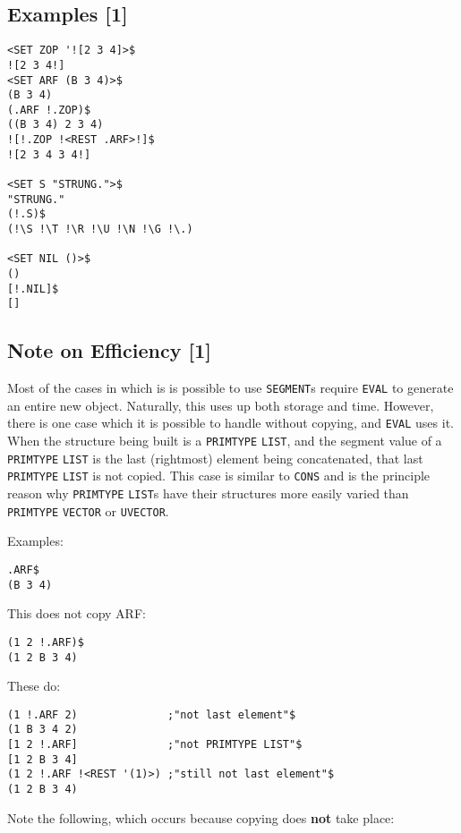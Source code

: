 \documentclass[a4paper]{scrbook}
\begin{document}
\subsection{Examples {[}1{]}}\label{examples-1-1}

\begin{verbatim}
<SET ZOP '![2 3 4]>$
![2 3 4!]
<SET ARF (B 3 4)>$
(B 3 4)
(.ARF !.ZOP)$
((B 3 4) 2 3 4)
![!.ZOP !<REST .ARF>!]$
![2 3 4 3 4!]

<SET S "STRUNG.">$
"STRUNG."
(!.S)$
(!\S !\T !\R !\U !\N !\G !\.)

<SET NIL ()>$
()
[!.NIL]$
[]
\end{verbatim}

\subsection{Note on Efficiency {[}1{]}}\label{note-on-efficiency-1}

Most of the cases in which is is possible to use \texttt{SEGMENT}s require \texttt{EVAL} to generate an entire new object.
Naturally, this uses up both storage and time. However, there is one case which it is possible to handle without copying,
and \texttt{EVAL} uses it. When the structure being built is a \texttt{PRIMTYPE} \texttt{LIST}, and
the segment value of a \texttt{PRIMTYPE} \texttt{LIST} is the last (rightmost) element being concatenated, that last
\texttt{PRIMTYPE} \texttt{LIST} is not copied. This case is similar to \texttt{CONS} and is the principle reason why
\texttt{PRIMTYPE} \texttt{LIST}s have their structures more easily varied than \texttt{PRIMTYPE} \texttt{VECTOR} or
\texttt{UVECTOR}.

Examples:

\begin{verbatim}
.ARF$
(B 3 4)
\end{verbatim}

This does not copy ARF:

\begin{verbatim}
(1 2 !.ARF)$
(1 2 B 3 4)
\end{verbatim}

These do:

\begin{verbatim}
(1 !.ARF 2)              ;"not last element"$
(1 B 3 4 2)
[1 2 !.ARF]              ;"not PRIMTYPE LIST"$
[1 2 B 3 4]
(1 2 !.ARF !<REST '(1)>) ;"still not last element"$
(1 2 B 3 4)
\end{verbatim}

Note the following, which occurs because copying does \textbf{not} take place:
\end{document}

